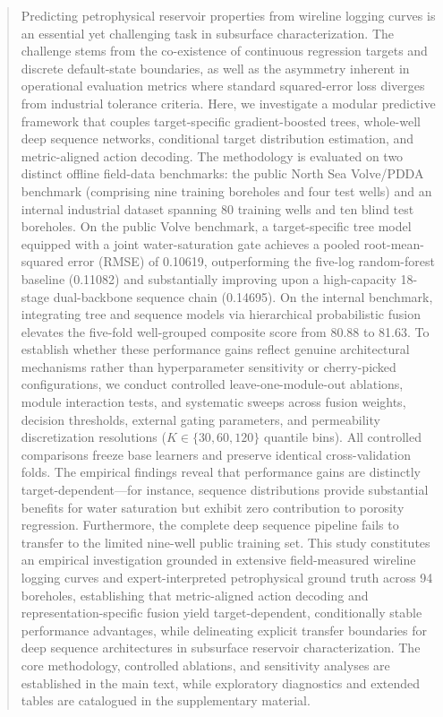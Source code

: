 \documentclass[preprint,12pt,nopreprintline]{elsarticle}
\begin{document}
\begin{frontmatter}
\begin{abstract}
Predicting petrophysical reservoir properties from wireline logging curves is an essential yet challenging task in subsurface characterization. The challenge stems from the co-existence of continuous regression targets and discrete default-state boundaries, as well as the asymmetry inherent in operational evaluation metrics where standard squared-error loss diverges from industrial tolerance criteria. Here, we investigate a modular predictive framework that couples target-specific gradient-boosted trees, whole-well deep sequence networks, conditional target distribution estimation, and metric-aligned action decoding. The methodology is evaluated on two distinct offline field-data benchmarks: the public North Sea Volve/PDDA benchmark (comprising nine training boreholes and four test wells) and an internal industrial dataset spanning 80 training wells and ten blind test boreholes. On the public Volve benchmark, a target-specific tree model equipped with a joint water-saturation gate achieves a pooled root-mean-squared error (RMSE) of 0.10619, outperforming the five-log random-forest baseline (0.11082) and substantially improving upon a high-capacity 18-stage dual-backbone sequence chain (0.14695). On the internal benchmark, integrating tree and sequence models via hierarchical probabilistic fusion elevates the five-fold well-grouped composite score from 80.88 to 81.63. To establish whether these performance gains reflect genuine architectural mechanisms rather than hyperparameter sensitivity or cherry-picked configurations, we conduct controlled leave-one-module-out ablations, module interaction tests, and systematic sweeps across fusion weights, decision thresholds, external gating parameters, and permeability discretization resolutions ($K \in \{30, 60, 120\}$ quantile bins). All controlled comparisons freeze base learners and preserve identical cross-validation folds. The empirical findings reveal that performance gains are distinctly target-dependent—for instance, sequence distributions provide substantial benefits for water saturation but exhibit zero contribution to porosity regression. Furthermore, the complete deep sequence pipeline fails to transfer to the limited nine-well public training set. This study constitutes an empirical investigation grounded in extensive field-measured wireline logging curves and expert-interpreted petrophysical ground truth across 94 boreholes, establishing that metric-aligned action decoding and representation-specific fusion yield target-dependent, conditionally stable performance advantages, while delineating explicit transfer boundaries for deep sequence architectures in subsurface reservoir characterization. The core methodology, controlled ablations, and sensitivity analyses are established in the main text, while exploratory diagnostics and extended tables are catalogued in the supplementary material.

\end{abstract}
\end{frontmatter}
\end{document}
